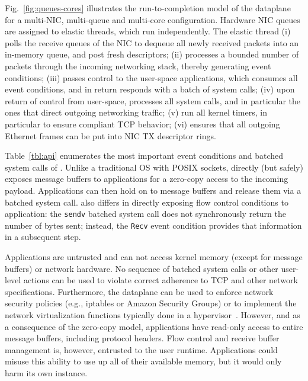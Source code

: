 Fig.~\ref{fig:queues-cores} illustrates the run-to-completion model of the
dataplane for a multi-NIC, multi-queue and multi-core configuration.
Hardware NIC queues are assigned to elastic threads, which run
independently.  The elastic thread (i) polls the receive queues of the
NIC to dequeue all newly received packets into an in-memory queue, and
post fresh descriptors; 
 (ii) processes a bounded number of packets
through the incoming networking stack, thereby generating event
conditions; (iii) passes control to the user-space applications, which
consumes all event conditions, and in return responds with a batch of
system calls; (iv) upon return of control from user-space, \ix
processes all system calls, and in particular the ones that direct
outgoing networking traffic; (v) run all kernel timers, in particular
to ensure compliant TCP behavior; (vi) ensures that all outgoing
Ethernet frames can be put into NIC TX descriptor rings.

Table~\ref{tbl:api} enumerates the most important event conditions and
batched system calls of \ix.  Unlike a traditional OS with POSIX
sockets, \ix directly (but safely) exposes message buffers to
applications for a zero-copy access to the incoming payload.
Applications can then hold on to message buffers and release them via
a batched system call.  \ix also differs in directly exposing flow
control conditions to application: the \texttt{sendv} batched system
call does not synchronously return the number of bytes sent; instead,
the \texttt{Recv} event condition provides that information in a
subsequent step.  

 Applications are
untrusted and can not access kernel memory (except for message
buffers) or network hardware.  No sequence of batched system calls or
other user-level actions can be used to violate correct adherence to
TCP and other network specifications.  Furthermore, the dataplane can
be used to enforce network security policies (e.g., iptables or Amazon
Security Groups) or to implement the network virtualization functions
typically done in a hypervisor~\cite{nsdi:nsx}.  However, and as a
consequence of the zero-copy model, applications have read-only access
to entire message buffers, including protocol headers.  Flow control
and receive buffer management is, however, entrusted to the user
runtime. Applications could misuse this ability to use up all of their
available memory, but it would only harm its own \ix instance.

